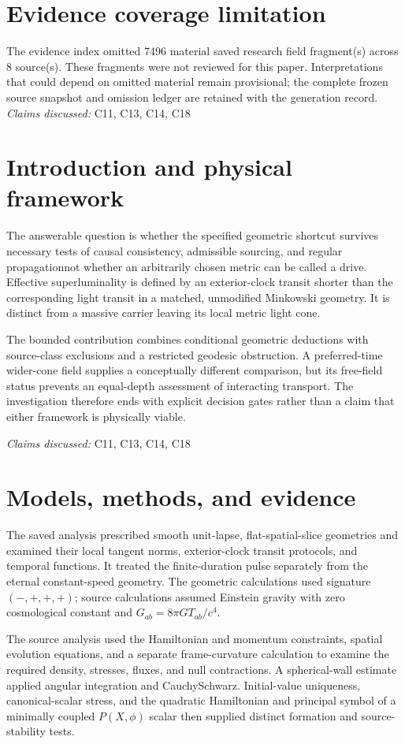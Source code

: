 \documentclass[11pt]{article}
\begin{document}
\section*{Evidence coverage limitation}
The evidence index omitted 7496 material saved research field fragment(s) across 8 source(s). These fragments were not reviewed for this paper. Interpretations that could depend on omitted material remain provisional; the complete frozen source snapshot and omission ledger are retained with the generation record.
\textit{Claims discussed: }C11, C13, C14, C18
\section{Introduction and physical framework}
The answerable question is whether the specified geometric shortcut survives necessary tests of causal consistency, admissible sourcing, and regular propagation\textemdash{}not whether an arbitrarily chosen metric can be called a drive. Effective superluminality is defined by an exterior-clock transit shorter than the corresponding light transit in a matched, unmodified Minkowski geometry. It is distinct from a massive carrier leaving its local metric light cone.

The bounded contribution combines conditional geometric deductions with source-class exclusions and a restricted geodesic obstruction. A preferred-time wider-cone field supplies a conceptually different comparison, but its free-field status prevents an equal-depth assessment of interacting transport. The investigation therefore ends with explicit decision gates rather than a claim that either framework is physically viable.

\textit{Claims discussed: }C11, C13, C14, C18
\section{Models, methods, and evidence}
The saved analysis prescribed smooth unit-lapse, flat-spatial-slice geometries and examined their local tangent norms, exterior-clock transit protocols, and temporal functions. It treated the finite-duration pulse separately from the eternal constant-speed geometry. The geometric calculations used signature $(-,+,+,+)$; source calculations assumed Einstein gravity with zero cosmological constant and $G_{ab}=8\pi G T_{ab}/c^4$.

The source analysis used the Hamiltonian and momentum constraints, spatial evolution equations, and a separate frame-curvature calculation to examine the required density, stresses, fluxes, and null contractions. A spherical-wall estimate applied angular integration and Cauchy\textendash{}Schwarz. Initial-value uniqueness, canonical-scalar stress, and the quadratic Hamiltonian and principal symbol of a minimally coupled $P(X,\phi)$ scalar then supplied distinct formation and source-stability tests.
\end{document}
